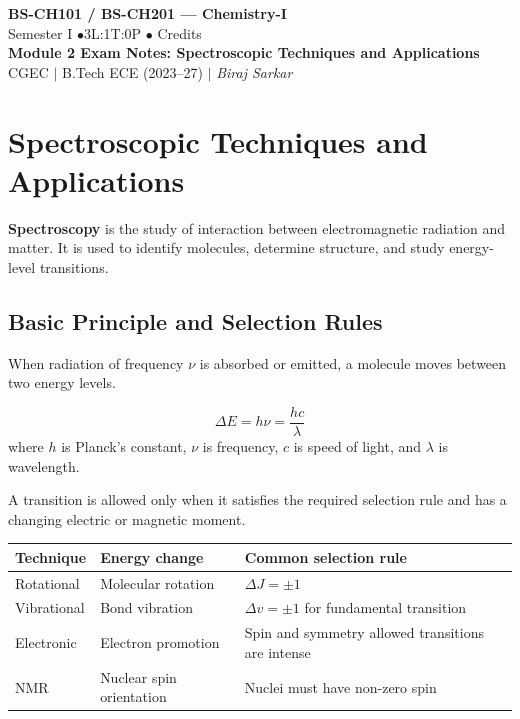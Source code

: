 \documentclass[12pt,a4paper]{article}
\begin{document}
\begin{center}
  {\LARGE\bfseries\color{myred} BS-CH101 / BS-CH201 --- Chemistry-I}\\[5pt]
  {\normalsize\color{mydark} Semester I \quad$\bullet$\quad 3L:1T:0P \quad$\bullet$ Credits}\\[3pt]
  {\normalsize\color{myteal}\textbf{Module 2 Exam Notes: Spectroscopic Techniques and Applications}}\\[3pt]
  {\small\color{mydark} CGEC \;$|$\; B.Tech ECE (2023--27) \;$|$\; \textit{Biraj Sarkar}}
\end{center}
\vspace{2pt}
\noindent{\color{myred}\rule{\linewidth}{1.5pt}}
\vspace{2pt}

\hypersetup{linkcolor=mydark}
\tableofcontents
\hypersetup{linkcolor=myteal}
\newpage
\section{Spectroscopic Techniques and Applications}

\begin{tcolorbox}[defbox]
\textbf{Spectroscopy} is the study of interaction between electromagnetic radiation and matter. It is used to identify molecules, determine structure, and study energy-level transitions.
\end{tcolorbox}

\subsection{Basic Principle and Selection Rules}
When radiation of frequency $\nu$ is absorbed or emitted, a molecule moves between two energy levels.

\begin{tcolorbox}[formulabox, title={Energy of Radiation}]
\[
\Delta E=h\nu=\frac{hc}{\lambda}
\]
where $h$ is Planck's constant, $\nu$ is frequency, $c$ is speed of light, and $\lambda$ is wavelength.
\end{tcolorbox}

A transition is allowed only when it satisfies the required selection rule and has a changing electric or magnetic moment.

\begin{tabularx}{\linewidth}{|B{3cm}|Y|Y|}
\hline
\textbf{Technique} & \textbf{Energy change} & \textbf{Common selection rule} \\
\hline
Rotational & Molecular rotation & $\Delta J=\pm 1$ \\
\hline
Vibrational & Bond vibration & $\Delta v=\pm 1$ for fundamental transition \\
\hline
Electronic & Electron promotion & Spin and symmetry allowed transitions are intense \\
\hline
NMR & Nuclear spin orientation & Nuclei must have non-zero spin \\
\hline
\end{tabularx}
\end{document}

